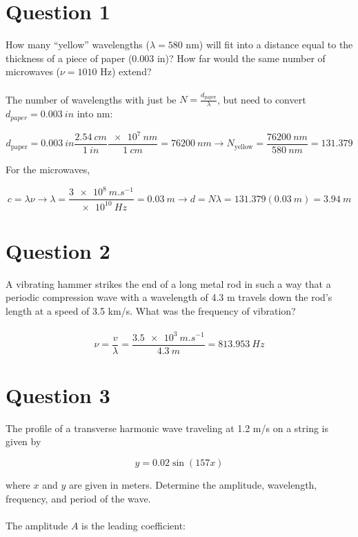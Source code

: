 \documentclass[a4paper]{article}
\begin{document}
\section*{Question 1}
How many “yellow” wavelengths ($\lambda = 580$ nm) will fit into a distance equal to the thickness of a
piece of paper (0.003 in)? How far would the same number of microwaves ($\nu = 1010$ Hz) extend? \\\\

The number of wavelengths with just be $N = \frac{d_{\textrm{paper}}}{\lambda}$, but need to convert $d_{paper} = \qty{0.003}{in}$ into nm:

\[
    d_{\textrm{paper}} = \qty{0.003}{in} \frac{\qty{2.54}{cm}}{\qty{1}{in}} \frac{\qty{e7}{nm}}{\qty{1}{cm}} = \qty{76200}{nm} \rightarrow 
    N_{\textrm{yellow}} = \frac{\qty{76200}{nm}}{\qty{580}{nm}} = 131.379
\]

For the microwaves,

\[
    c = \lambda \nu \rightarrow \lambda = \frac{\qty{3e8}{m.s^{-1}}}{\qty{e10}{Hz}} = \qty{0.03}{m}
    \rightarrow d = N\lambda = 131.379(\qty{0.03}{m}) = \qty{3.94}{m}
\]

\section*{Question 2}
A vibrating hammer strikes the end of a long metal rod in such a way that a periodic compression
wave with a wavelength of 4.3 m travels down the rod's length at a speed of 3.5 km/s. What was the
frequency of vibration? \\\\

\[
    \nu = \frac{v}{\lambda} = \frac{\qty{3.5e3}{m.s^{-1}}}{\qty{4.3}{m}} = \qty{813.953}{Hz}
\]

\section*{Question 3}
The profile of a transverse harmonic wave traveling at 1.2 m/s on a string is given by

\[
    y = 0.02\sin(157x)
\]

where $x$ and $y$ are given in meters. Determine the amplitude, wavelength, frequency, and period of the
wave.\\\\

The amplitude $A$ is the leading coefficient:
\end{document}
